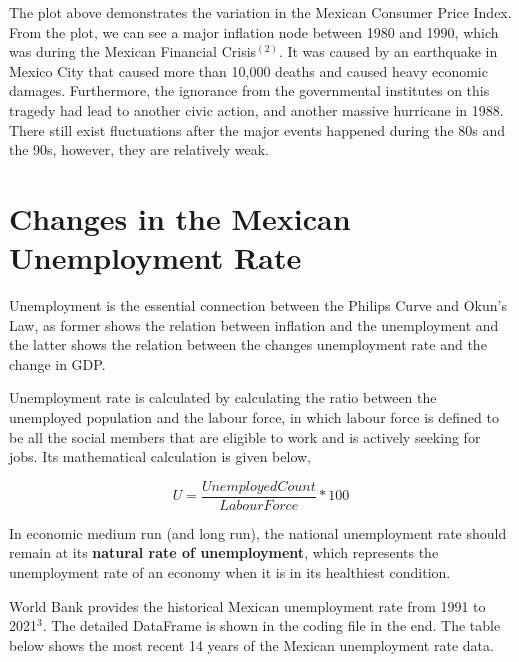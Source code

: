 \documentclass{article}
\begin{document}
    {The plot above demonstrates the variation in the Mexican Consumer Price Index. From the plot, we can see a major inflation node between 1980 and 1990, which was during the Mexican Financial Crisis$^{(2)}$. It was caused by an earthquake in Mexico City that caused more than 10,000 deaths and caused heavy economic damages. Furthermore, the ignorance from the governmental institutes on this tragedy had lead to another civic action, and another massive hurricane in 1988. There still exist fluctuations after the major events happened during the 80s and the 90s, however, they are relatively weak.}


\section{Changes in the Mexican Unemployment Rate}

    \hspace{5mm}{Mexico's unemployment rate has varied significantly over time, reflecting the country's economic and political changes. Historically, Mexico has experienced relatively high levels of unemployment, with peaks occurring during times of economic crisis and recession.}

    {Unemployment is the essential connection between the Philips Curve and Okun's Law, as former shows the relation between inflation and the unemployment and the latter shows the relation between the changes unemployment rate and the change in GDP.}

    {Unemployment rate is calculated by calculating the ratio between the unemployed population and the labour force, in which labour force is defined to be all the social members that are eligible to work and is actively seeking for jobs. Its mathematical calculation is given below,}

    \begin{equation}
        U = \frac{Unemployed Count}{Labour Force} * 100
    \end{equation}

    {In economic medium run (and long run), the national unemployment rate should remain at its \textbf{natural rate of unemployment}, which represents the unemployment rate of an economy when it is in its healthiest condition.}

    {World Bank provides the historical Mexican unemployment rate from 1991 to 2021$^{3}$. The detailed DataFrame is shown in the coding file in the end. The table below shows the most recent 14 years of the Mexican unemployment rate data.}
\end{document}
